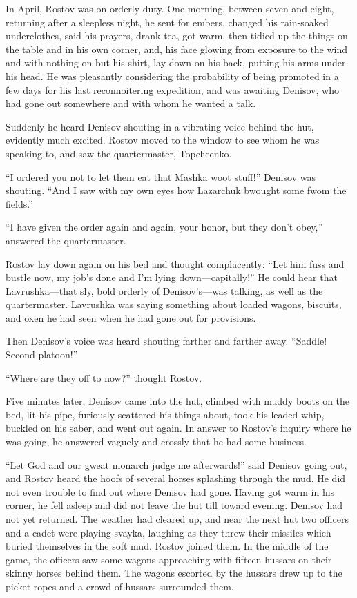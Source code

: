 In April, Rostov was on orderly duty. One morning, between seven
and eight, returning after a sleepless night, he sent for embers,
changed his rain-soaked underclothes, said his prayers, drank
tea, got warm, then tidied up the things on the table and in his
own corner, and, his face glowing from exposure to the wind and
with nothing on but his shirt, lay down on his back, putting his
arms under his head. He was pleasantly considering the
probability of being promoted in a few days for his last
reconnoitering expedition, and was awaiting Denisov, who had gone
out somewhere and with whom he wanted a talk.

Suddenly he heard Denisov shouting in a vibrating voice behind
the hut, evidently much excited. Rostov moved to the window to
see whom he was speaking to, and saw the quartermaster,
Topcheenko.

``I ordered you not to let them eat that Mashka woot stuff!''
Denisov was shouting. ``And I saw with my own eyes how Lazarchuk
bwought some fwom the fields.''

``I have given the order again and again, your honor, but they
don't obey,'' answered the quartermaster.

Rostov lay down again on his bed and thought complacently: ``Let
him fuss and bustle now, my job's done and I'm lying
down---capitally!'' He could hear that Lavrushka---that sly, bold
orderly of Denisov's---was talking, as well as the
quartermaster. Lavrushka was saying something about loaded
wagons, biscuits, and oxen he had seen when he had gone out for
provisions.

Then Denisov's voice was heard shouting farther and farther away.
``Saddle! Second platoon!''

``Where are they off to now?'' thought Rostov.

Five minutes later, Denisov came into the hut, climbed with muddy
boots on the bed, lit his pipe, furiously scattered his things
about, took his leaded whip, buckled on his saber, and went out
again. In answer to Rostov's inquiry where he was going, he
answered vaguely and crossly that he had some business.

``Let God and our gweat monarch judge me afterwards!'' said
Denisov going out, and Rostov heard the hoofs of several horses
splashing through the mud. He did not even trouble to find out
where Denisov had gone. Having got warm in his corner, he fell
asleep and did not leave the hut till toward evening. Denisov had
not yet returned. The weather had cleared up, and near the next
hut two officers and a cadet were playing svayka, laughing as
they threw their missiles which buried themselves in the soft
mud. Rostov joined them. In the middle of the game, the officers
saw some wagons approaching with fifteen hussars on their skinny
horses behind them. The wagons escorted by the hussars drew up to
the picket ropes and a crowd of hussars surrounded them.

